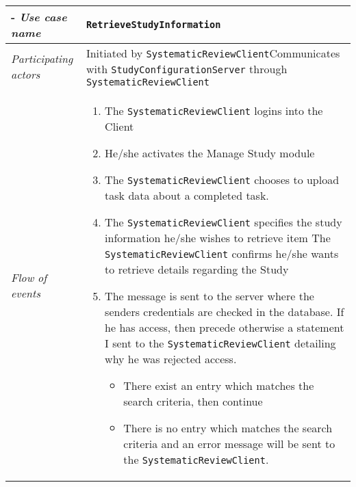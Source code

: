 
%
%
\newcommand{\client}{\texttt{SystematicReviewClient}\xspace}
\newcommand{\server}{\texttt{StudyConfigurationServer}\xspace}
\newcommand{\studyconfigui}{\texttt{StudyConfigurationUI}\xspace}
\newcommand{\teammanagement}{\texttt{Team Management}\xspace}
\newcommand{\researcher}{\texttt{Researcher}\xspace}
\newcommand{\database}{\texttt{Database}\xspace}
\newcommand{\incident}{\texttt{Incident}\xspace}
\newcommand{\RetrieveStudyInformation}{\texttt{RetrieveStudyInformation}\xspace}
\newcommand{\validateuser}{\texttt{ValidateUser}\xspace}


%
%
\begin{table}[h!]
\tabulinesep=1.5mm
\begin{tabu} to 
	\tabucline[1.5pt]-
	\textit{Use case name} & \RetrieveStudyInformation \\
	\hline
	\textit{Participating actors} & Initiated by \client \newline Communicates with \server through \client \\
	\hline
	\textit{Flow of events} &
	\vspace{-3mm}
	\begin{enumerate}[leftmargin=*,topsep=0pt,itemsep=-1ex]
		\item The \client logins into the Client
		\item He/she activates the Manage Study module
		\item The \client chooses to upload task data about a completed task.
		\item The \client specifies the study information he/she wishes to retrieve
		item The \client confirms he/she wants to retrieve details regarding the Study
		\item The message is sent to the server where the senders credentials are checked in the database. If he has access, then precede otherwise a statement I sent to the \client detailing why he was rejected access.
		\begin{itemize} 
			\item There exist an entry which matches the search criteria, then continue 
			\item There is no entry which matches the search criteria and an error message will be sent to the \client.
		\end{itemize}
				

\end{enumerate}
\end{tabu}
\end{table}

